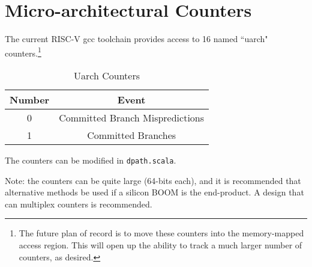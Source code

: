 \chapter{Micro-architectural Counters}

The current RISC-V gcc toolchain provides access to 16 named ``uarch" counters.\footnote{The future plan of record is to move these counters into the memory-mapped access region. This will open up the ability to track a much larger number of counters, as desired.}

\begin{table}[htdp]
\caption{Uarch Counters}
\begin{center}
\begin{tabular}{|c|c|}
\hline
Number & Event \\
\hline
\hline
0 & Committed Branch Mispredictions \\
\hline
1 & Committed Branches \\
\hline
\end{tabular}
\end{center}
\label{table:uarchcounters}
\end{table}%

The counters can be modified in {\tt dpath.scala}. 

Note: the counters can be quite large (64-bits each), and it is recommended that alternative methods be used if a silicon BOOM is the end-product. A design that can multiplex counters is recommended. 


